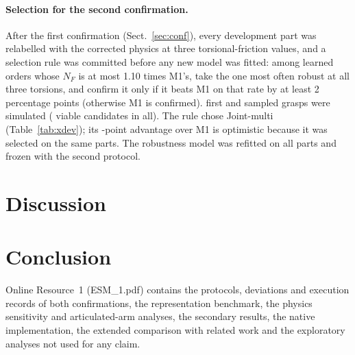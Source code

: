 \documentclass[pdflatex,sn-mathphys-num,iicol]{sn-jnl}
\begin{document}
\paragraph{Selection for the second confirmation.} After the first confirmation (Sect.~\ref{sec:conf}), every development part was relabelled with the corrected physics at three torsional-friction values, and a selection rule was committed before any new model was fitted: among learned orders whose $N_F$ is at most 1.10 times M1's, take the one most often robust at all three torsions, and confirm it only if it beats M1 on that rate by at least 2 percentage points (otherwise M1 is confirmed). \vSimulated{} first and sampled grasps were simulated (\vViable{} viable candidates in all). The rule chose Joint-multi (Table~\ref{tab:xdev}); its \vAdv-point advantage over M1 is optimistic because it was selected on the same parts. The robustness model was refitted on all parts and frozen with the second protocol.

\begin{table}[t]
\caption{Development, second analysis (\devParts{} parts with dynamics, out of fold, same parts in every row): geometric-mean $N_F$ and the share of first grasps that are robust (torsion 0.005~m), robust at all three torsions, and load tolerant. GPD+gate: GPD's classifier orders the same catalogue (Sect.~\ref{sec:cost}). Joint-multi was selected on these parts.}\label{tab:xdev}
\centering\small

\end{table}





\section{Discussion}\label{sec:discussion}



\section{Conclusion}\label{sec:conclusion}



\backmatter

 Online Resource~1 (ESM\_1.pdf) contains the protocols, deviations and execution records of both confirmations, the representation benchmark, the physics sensitivity and articulated-arm analyses, the secondary results, the native implementation, the extended comparison with related work and the exploratory analyses not used for any claim.
\end{document}
